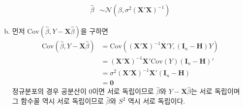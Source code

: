 \documentclass[answers]{exam}
\begin{document}
\begin{questions}
\begin{solution}
\begin{enumerate}[(a)]
\begin{align}
          \widehat{\beta} &\sim \mathcal{N}\left(\beta,\sigma^{2}\left(\mathbf{X}'\mathbf{X}\right)^{-1}\right)
        \end{align}
        \item 먼저 $\mathrm{Cov}\left(\widehat{\beta},Y-\mathbf{X}\widehat{\beta}\right)$을 구하면
        \begin{align}
          \mathrm{Cov}\left(\widehat{\beta},Y-\mathbf{X}\widehat{\beta}\right) &= \mathrm{Cov}\left(\left(\mathbf{X}'\mathbf{X}\right)^{-1}\mathbf{X}'Y,\left(\mathbf{I}_{n}-\mathbf{H}\right)Y\right)\\
          &=\left(\mathbf{X}'\mathbf{X}\right)^{-1}\mathbf{X}'\mathrm{Cov}\left(Y\right)\left(\mathbf{I}_{n}-\mathbf{H}\right)'\\
          &=\sigma^{2}\left(\mathbf{X}'\mathbf{X}\right)^{-1}\mathbf{X}'\left(\mathbf{I}_{n}-\mathbf{H}\right)\\
          &= \mathbf{0}
        \end{align}
        정규분포의 경우 공분산이 0이면 서로 독립이므로 $\widehat{\beta}$와 $Y-\mathbf{X}\widehat{\beta}$는 서로 독립이며 그 함수꼴 역시 서로 독립이므로 $\widehat{\beta}$와 $S^{2}$ 역시 서로 독립이다.
      \end{enumerate}
    \end{solution}
\end{questions}
\end{document}
